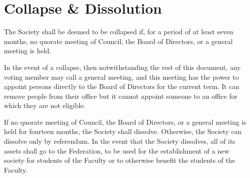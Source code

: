 \section{Collapse \& Dissolution}
The Society shall be deemed to be collapsed if, for a period of at least seven
months, no quorate meeting of Council, the Board of Directors, or a general
meeting is held.

In the event of a collapse, then notwithstanding the rest of this document, any
voting member may call a general meeting, and this meeting has the power to
appoint persons directly to the Board of Directors for the current term. It can
remove people from their office but it cannot appoint someone to an office for
which they are not eligible.

If no quorate meeting of Council, the Board of Directors, or a general meeting
is held for fourteen months, the Society shall dissolve. Otherwise, the Society
can dissolve only by referendum.  In the event that the Society dissolves, all
of its assets shall go to the Federation, to be used for the establishment of a
new society for students of the Faculty or to otherwise benefit the students of
the Faculty.
